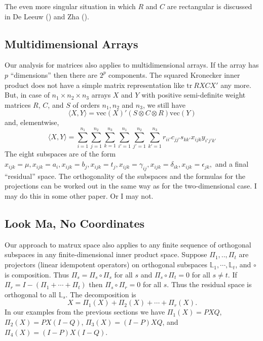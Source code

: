 \documentclass[
  12pt,
  letterpaper,
  DIV=11,
  numbers=noendperiod]{scrartcl}
\begin{document}
The even more singular situation in which \(R\) and \(C\) are
rectangular is discussed in De Leeuw
() and Zha
().

\subsection{Multidimensional Arrays}\label{multidimensional-arrays}

Our analysis for matrices also applies to multidimensional arrays. If
the array has \(p\) ``dimensions'' then there are \(2^p\) components.
The squared Kronecker inner product does not have a simple matrix
representation like \(\text{tr}\ RXCX'\) any more. But, in case of
\(n_1\times n_2\times n_3\) arrays \(X\) and \(Y\) with positive
semi-definite weight matrices \(R\), \(C\), and \(S\) of orders
\(n_1, n_2\) and \(n_3\), we still have \begin{equation}
\langle X,Y\rangle = \text{vec}(X)'(S\otimes C\otimes R)\text{vec}(Y)
\end{equation} and, elementwise, \begin{equation}
\langle X,Y\rangle = \sum_{i=1}^{n_1}\sum_{j=1}^{n_2}\sum_{k=1}^{n_3}\sum_{i'=1}^{n_1}\sum_{j'=1}^{n_2}\sum_{k'=1}^{n_3} r_{ii'}c_{jj'}s_{kk'}x_{ijk}y_{i'j'k'}
\end{equation} The eight subspaces are of the form \(x_{ijk}=\mu,
x_{ijk}=a_i,
x_{ijk}=b_j,
x_{ijk}=t_j,
x_{ijk}=\gamma_{ij},
x_{ijk}=\delta_{ik},
x_{ijk}=\epsilon_{jk},\) and a final ``residual'' space. The
orthogonality of the subspaces and the formulas for the projections can
be worked out in the same way as for the two-dimensional case. I may do
this in some other paper. Or I may not.

\subsection{Look Ma, No Coordinates}\label{look-ma-no-coordinates}

Our approach to matrux space also applies to any finite sequence of
orthogonal subspaces in any finite-dimensional inner product space.
Suppose \(\Pi_1,..,\Pi_t\) are projectors (linear idempotent operators)
on orthogonal subspaces \(\mathbb{L}_1,\cdots,\mathbb{L}_t\), and
\(\circ\) is composition. Thus \(\Pi_s=\Pi_s\circ\Pi_s\) for all \(s\)
and \(\Pi_s\circ \Pi_t=0\) for all \(s\neq t\). If
\(\Pi_r=I-(\Pi_1+\cdots+\Pi_t)\) then \(\Pi_s\circ \Pi_r=0\) for all
\(s\). Thus the residual space is orthogonal to all \(\mathbb{L}_s\).
The decomposition is \begin{equation}
X=\Pi_1(X)+\Pi_2(X)+\cdots+\Pi_r(X).
\end{equation} In our examples from the previous sections we have
\(\Pi_1(X)=PXQ\), \(\Pi_2(X)=PX(I-Q)\), \(\Pi_3(X)=(I-P)XQ\), and
\(\Pi_4(X)=(I-P)X(I-Q)\).
\end{document}
